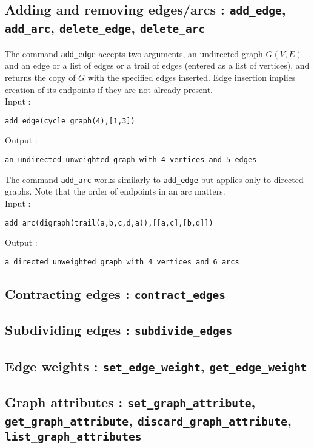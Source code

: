 \documentclass[a4paper,11pt]{article}
\begin{document}
\subsection{Adding and removing edges/arcs : {\tt add\_edge}, {\tt add\_arc}, {\tt delete\_edge}, {\tt delete\_arc}}

The command {\tt add\_edge} accepts two arguments, an undirected graph $ G(V,E) $ and an edge or a list of edges or a trail of edges (entered as a list of vertices), and returns the copy of $ G $ with the specified edges inserted. Edge insertion implies creation of its endpoints if they are not already present.\\
Input :
\begin{center}
  \tt add\_edge(cycle\_graph(4),[1,3])
\end{center}
Output :
\begin{center}
  \tt an undirected unweighted graph with 4 vertices and 5 edges
\end{center}

The command {\tt add\_arc} works similarly to {\tt add\_edge} but applies only to directed graphs. Note that the order of endpoints in an arc matters.\\
Input :
\begin{center}
  \tt add\_arc(digraph(trail(a,b,c,d,a)),[[a,c],[b,d]])
\end{center}
Output :
\begin{center}
  \tt a directed unweighted graph with 4 vertices and 6 arcs
\end{center}

\subsection{Contracting edges : {\tt contract\_edges}}

\subsection{Subdividing edges : {\tt subdivide\_edges}}

\subsection{Edge weights : {\tt set\_edge\_weight}, {\tt get\_edge\_weight}}

\subsection{Graph attributes : {\tt set\_graph\_attribute}, {\tt get\_graph\_attribute}, {\tt discard\_graph\_attribute}, {\tt list\_graph\_attributes}}
\end{document}
